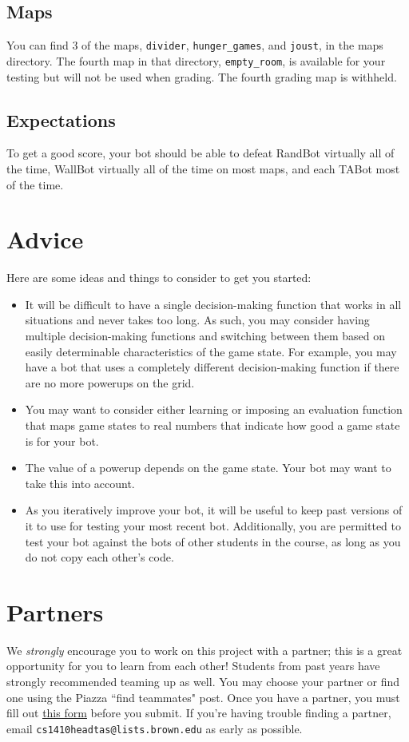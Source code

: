 \documentclass{article}
\begin{document}
\subsection{Maps}
You can find 3 of the maps, \verb|divider|, \verb|hunger_games|, and \verb|joust|, in the maps directory.
The fourth map in that directory, \verb|empty_room|, is available for your testing but will not be used when grading.
The fourth grading map is withheld.

\subsection{Expectations}
To get a good score, your bot should be able to defeat RandBot virtually all of the time, WallBot virtually all of the time on most maps, and each TABot most of the time.

\section{Advice}
Here are some ideas and things to consider to get you started:

\begin{itemize}
\item It will be difficult to have a single decision-making function that works in all situations and never takes too long.
As such, you may consider having multiple decision-making functions and switching between them based on easily determinable characteristics of the game state.
For example, you may have a bot that uses a completely different decision-making function if there are no more powerups on the grid.

\item You may want to consider either learning or imposing an evaluation function that maps game states to real numbers that indicate how good a game state is for your bot.

\item The value of a powerup depends on the game state.
Your bot may want to take this into account.

\item As you iteratively improve your bot, it will be useful to keep past versions of it to use for testing your most recent bot.
Additionally, you are permitted to test your bot against the bots of other students in the course, as long as you do not copy each other's code.
\end{itemize}

\section{Partners}
We \textit{strongly} encourage you to work on this project with a partner; this is a great opportunity for you to learn from each other!
Students from past years have strongly recommended teaming up as well.
You may choose your partner or find one using the Piazza ``find teammates" post.
Once you have a partner, you must fill out \href{https://goo.gl/forms/Iw28IP74KXJV6Bcn2}{\underline{this form}} before you submit.
If you're having trouble finding a partner, email \verb|cs1410headtas@lists.brown.edu| as early as possible.
\end{document}
